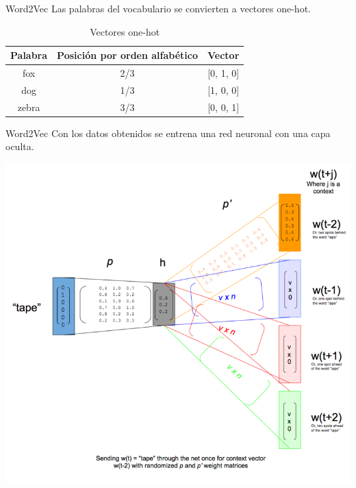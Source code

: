 \documentclass{beamer}
\begin{document}
  \begin{frame}{Word2Vec}
      Las palabras del vocabulario se convierten a vectores one-hot.

      \begin{table}
          \centering
          \begin{tabular}{ccc}
              \toprule
              Palabra & Posición por orden alfabético & Vector\\
              \midrule
              fox & 2/3 & [0, 1, 0]\\
              dog & 1/3 & [1, 0, 0]\\
              zebra & 3/3 & [0, 0, 1]\\
              \bottomrule
          \end{tabular}
          \caption{Vectores one-hot}
      \end{table}
  \end{frame}
  \begin{frame}{Word2Vec}
      Con los datos obtenidos se entrena una red neuronal con una capa oculta.

      \centering
      \includegraphics[scale=0.50]{./figures/skip-gram-exp.png}
  \end{frame}
\end{document}
